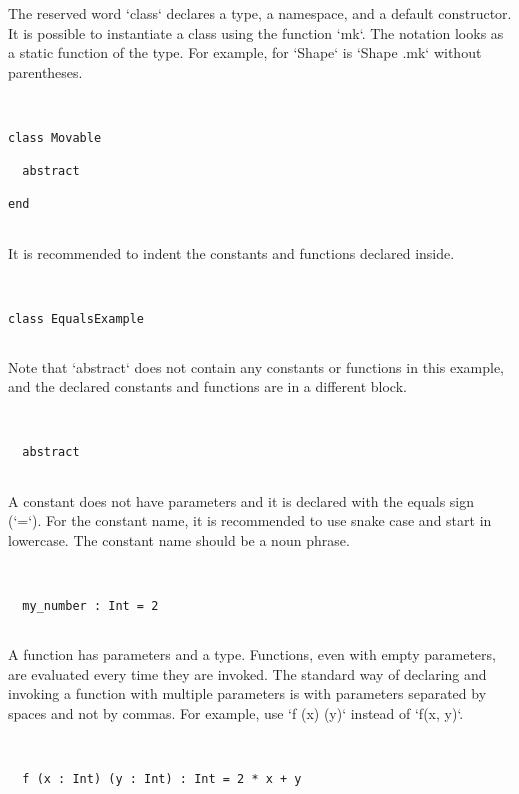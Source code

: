 \documentclass[12pt,a4paper]{article}
\begin{document}
The reserved word `class` declares a type, a namespace, and a default constructor.
It is possible to instantiate a class using the function `mk`. The notation looks
as a static function of the type. For example, for `Shape` is `Shape .mk` without
parentheses.


\begin{lstlisting}


class Movable

  abstract

end


\end{lstlisting}

It is recommended to indent the constants and functions declared inside.


\begin{lstlisting}


class EqualsExample


\end{lstlisting}

Note that `abstract` does not contain any constants or functions in this example, and the
declared constants and functions are in a different block.


\begin{lstlisting}


  abstract


\end{lstlisting}

A constant does not have parameters and it is declared with the equals sign (`=`).
For the constant name, it is recommended to use snake case and start in lowercase.
The constant name should be a noun phrase.


\begin{lstlisting}


  my_number : Int = 2


\end{lstlisting}

A function has parameters and a type. Functions, even with empty parameters, are evaluated
every time they are invoked. The standard way of declaring and invoking a function
with multiple parameters is with parameters separated by spaces and not by commas.
For example, use `f (x) (y)` instead of `f(x, y)`.


\begin{lstlisting}


  f (x : Int) (y : Int) : Int = 2 * x + y


\end{lstlisting}
\end{document}
